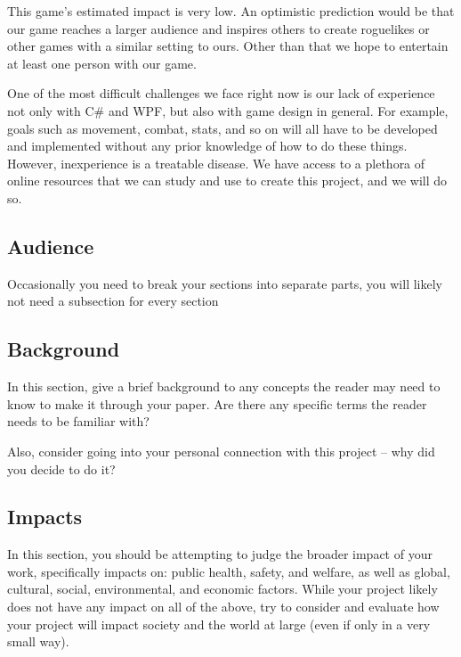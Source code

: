 \documentclass[10pt,conference,onecolumn,compsoc]{IEEEtran}
\begin{document}
This game's estimated impact is very low. An optimistic prediction would be that our game reaches a larger audience and inspires others to create roguelikes or other games with a similar setting to ours. Other than that we hope to entertain at least one person with our game.

One of the most difficult challenges we face right now is our lack of experience not only with C\# and WPF, but also with game design in general. For example, goals such as movement, combat, stats, and so on will all have to be developed and implemented without any prior knowledge of how to do these things. However, inexperience is a treatable disease. We have access to a plethora of online resources that we can study and use to create this project, and we will do so. 


\subsection{Audience}
Occasionally you need to break your sections into separate parts, you will likely not need a subsection for every section


\subsection{Background}
In this section, give a brief background to any concepts the reader may need to know to make it through your paper.   Are there any specific terms the reader needs to be familiar with?

Also, consider going into your personal connection with this project -- why did you decide to do it?

\subsection{Impacts}
In this section, you should be attempting to judge the broader impact of your work, specifically impacts on: public health, safety, and welfare, as well as global, cultural, social, environmental, and economic factors.  While your project likely does not have any impact on all of the above, try to consider and evaluate how your project will impact society and the world at large (even if only in a very small way).
\end{document}

